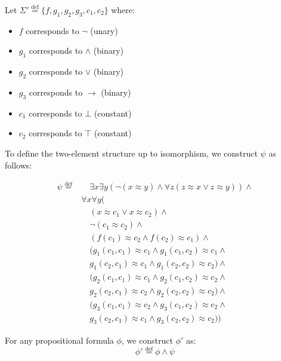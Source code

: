 \documentclass{article}
\newcommand{\defeq}{\stackrel{\text{def}}{=}}
\begin{document}
Let $\Sigma' \defeq \{f, g_1, g_2, g_3, c_1, c_2\}$ where:
\begin{itemize}
    \item $f$ corresponds to $\neg$ (unary)
    \item $g_1$ corresponds to $\land$ (binary)
    \item $g_2$ corresponds to $\lor$ (binary)
    \item $g_3$ corresponds to $\to$ (binary)
    \item $c_1$ corresponds to $\bot$ (constant)
    \item $c_2$ corresponds to $\top$ (constant)
\end{itemize}

To define the two-element structure up to isomorphism, we construct $\psi$ as follows:

\[\begin{aligned}
\psi \defeq & \hspace{1em} \exists x \exists y (\neg(x \approx y) \land \forall z(z \approx x \lor z \approx y)) \land \\
& \forall x \forall y ( \\
& \quad (x \approx c_1 \lor x \approx c_2) \land \\
& \quad \neg(c_1 \approx c_2) \land \\
& \quad (f(c_1) \approx c_2 \land f(c_2) \approx c_1) \land \\
& \quad (g_1(c_1, c_1) \approx c_1 \land g_1(c_1, c_2) \approx c_1 \land \\
& \quad g_1(c_2, c_1) \approx c_1 \land g_1(c_2, c_2) \approx c_2) \land \\
& \quad (g_2(c_1, c_1) \approx c_1 \land g_2(c_1, c_2) \approx c_2 \land \\
& \quad g_2(c_2, c_1) \approx c_2 \land g_2(c_2, c_2) \approx c_2) \land \\
& \quad (g_3(c_1, c_1) \approx c_2 \land g_3(c_1, c_2) \approx c_2 \land \\
& \quad g_3(c_2, c_1) \approx c_1 \land g_3(c_2, c_2) \approx c_2))
\end{aligned}\]

For any propositional formula $\phi$, we construct $\phi'$ as:
\[\phi' \defeq \phi \land \psi\]
\end{document}

